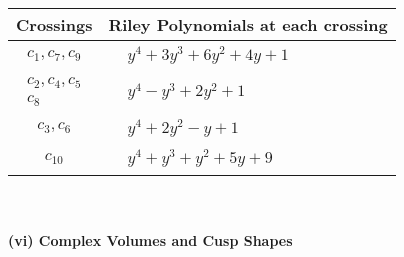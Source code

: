 \documentclass[1p]{elsarticle_modified}
\theoremstyle{definition}
\begin{document}
\begin{tabular}{m{50pt}|m{274pt}}
Crossings & \hspace{64pt}Riley Polynomials at each crossing \\
\hline $$\begin{aligned}c_{1},c_{7},c_{9}\end{aligned}$$&$\begin{aligned}
&y^4+3 y^3+6 y^2+4 y+1
\end{aligned}$\\
\hline $$\begin{aligned}c_{2},c_{4},c_{5}\\c_{8}\end{aligned}$$&$\begin{aligned}
&y^4- y^3+2 y^2+1
\end{aligned}$\\
\hline $$\begin{aligned}c_{3},c_{6}\end{aligned}$$&$\begin{aligned}
&y^4+2 y^2- y+1
\end{aligned}$\\
\hline $$\begin{aligned}c_{10}\end{aligned}$$&$\begin{aligned}
&y^4+y^3+y^2+5 y+9
\end{aligned}$\\
\hline
\end{tabular}\\~\\
\newpage\flushleft \textbf{(vi) Complex Volumes and Cusp Shapes}
\end{document}
